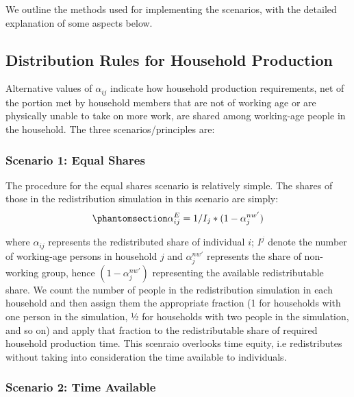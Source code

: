 \documentclass[
  11pt,
]{article}
\begin{document}
We outline the methods used for implementing the scenarios, with the
detailed explanation of some aspects below.

\subsection{Distribution Rules for Household
Production}\label{distribution-rules-for-household-production}

Alternative values of \(\alpha_{ij}\) indicate how household production
requirements, net of the portion met by household members that are not
of working age or are physically unable to take on more work, are shared
among working-age people in the household. The three
scenarios/principles are:

\subsubsection{Scenario 1: Equal Shares}\label{scenario-1-equal-shares}

The procedure for the equal shares scenario is relatively simple. The
shares of those in the redistribution simulation in this scenario are
simply:
\begin{equation}\phantomsection\label{eq-r1}{\alpha_{ij}^E= 1/I_j*(1-\alpha_{j}^{nw'})
}\end{equation}

where \(\alpha_{ij}\) represents the redistributed share of individual
\(i\); \(I^j\) denote the number of working-age persons in household
\(j\) and \(\alpha_{j}^{nw'}\) represents the share of non-working
group, hence \((1-\alpha_{j}^{nw'})\) representing the available
redistributable share. We count the number of people in the
redistribution simulation in each household and then assign them the
appropriate fraction (1 for households with one person in the
simulation, 1⁄2 for households with two people in the simulation, and so
on) and apply that fraction to the redistributable share of required
household production time. This scenraio overlooks time equity, i.e
redistributes without taking into consideration the time available to
individuals.

\subsubsection{Scenario 2: Time
Available}\label{scenario-2-time-available}
\end{document}

